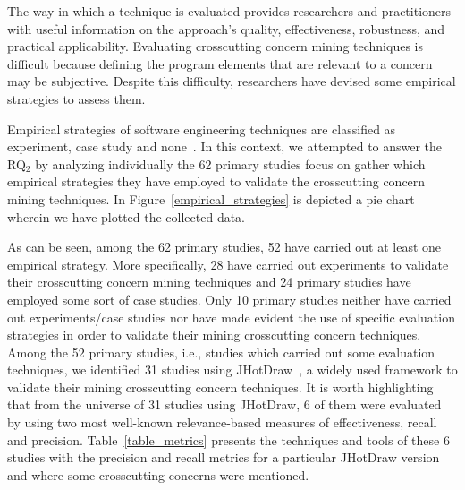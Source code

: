 The way in which a technique is evaluated provides researchers and practitioners with useful information on the approach's quality, effectiveness, robustness, and practical applicability. Evaluating crosscutting concern mining techniques is difficult because defining the program elements that are relevant to a concern may be subjective. Despite this difficulty, researchers have devised some empirical strategies to assess them. 

Empirical strategies of software engineering techniques are classified as  experiment, case study and none~\cite{Wohlin}. In this context, we attempted to answer the RQ$_2$ by analyzing individually the 62 primary studies focus on gather which empirical strategies they have employed to validate the crosscutting concern mining techniques. In Figure~\ref{empirical_strategies} is depicted a pie chart wherein we have plotted the collected data. 

As can be seen, among the 62 primary studies, 52 have carried out at least one empirical strategy. More specifically, 28 have carried out experiments to validate their crosscutting concern mining techniques and 24 primary studies have employed some sort of case studies. Only 10 primary studies neither have carried out experiments/case studies nor have made evident the use of specific evaluation strategies in order to validate their mining crosscutting concern techniques. Among the 52 primary studies, i.e., studies which carried out some evaluation techniques, we identified 31 studies using JHotDraw~\cite{brantHot}, a widely used framework to validate their mining crosscutting concern techniques. It is worth highlighting that from the universe of 31 studies using JHotDraw, 6 of them were evaluated by using two most well-known relevance-based measures of effectiveness, recall and precision. Table~\ref{table_metrics} presents the techniques and tools of these 6 studies with the precision and recall metrics for a particular JHotDraw version and where some crosscutting concerns were mentioned.


